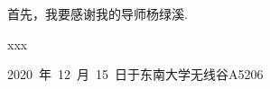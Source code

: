 




首先，我要感谢我的导师杨绿溪.



\begin{flushright}
xxx \hspace{3cm}

2020~年~12~月~15~日于东南大学无线谷A5206
\end{flushright}

